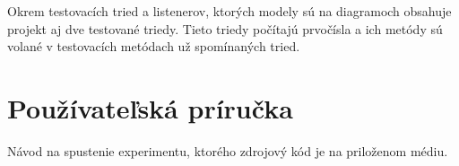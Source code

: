 \documentclass[11pt,twoside,slovak,a4paper]{article}
\begin{document}
 	Okrem testovacích tried a listenerov, ktorých modely sú na diagramoch obsahuje projekt aj dve testované triedy. Tieto triedy počítajú prvočísla a ich metódy sú volané v testovacích metódach už spomínaných tried.
 	
 	
 	\newpage
 	\sloppy
 	\section{Používateľská príručka}
 	
 	Návod na spustenie experimentu, ktorého zdrojový kód je na priloženom médiu.
 	
\end{document}
